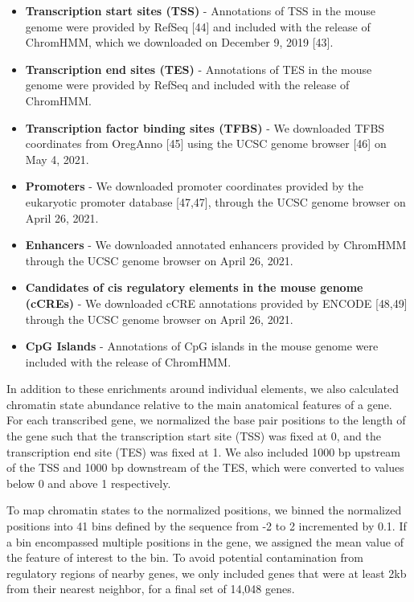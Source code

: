 \documentclass[10pt,letterpaper]{article}
\providecommand{\tightlist}{%
  \setlength{\itemsep}{0pt}\setlength{\parskip}{0pt}}
\begin{document}
\begin{itemize}
\tightlist
\item
  \textbf{Transcription start sites (TSS)} - Annotations of TSS in the
  mouse genome were provided by RefSeq {[}44{]} and included with the
  release of ChromHMM, which we downloaded on December 9, 2019 {[}43{]}.
\item
  \textbf{Transcription end sites (TES)} - Annotations of TES in the
  mouse genome were provided by RefSeq and included with the release of
  ChromHMM.
\item
  \textbf{Transcription factor binding sites (TFBS)} - We downloaded
  TFBS coordinates from OregAnno {[}45{]} using the UCSC genome browser
  {[}46{]} on May 4, 2021.
\item
  \textbf{Promoters} - We downloaded promoter coordinates provided by
  the eukaryotic promoter database {[}47,47{]}, through the UCSC genome
  browser on April 26, 2021.
\item
  \textbf{Enhancers} - We downloaded annotated enhancers provided by
  ChromHMM through the UCSC genome browser on April 26, 2021.
\item
  \textbf{Candidates of cis regulatory elements in the mouse genome
  (cCREs)} - We downloaded cCRE annotations provided by ENCODE
  {[}48,49{]} through the UCSC genome browser on April 26, 2021.
\item
  \textbf{CpG Islands} - Annotations of CpG islands in the mouse genome
  were included with the release of ChromHMM.
\end{itemize}

In addition to these enrichments around individual elements, we also
calculated chromatin state abundance relative to the main anatomical
features of a gene. For each transcribed gene, we normalized the base
pair positions to the length of the gene such that the transcription
start site (TSS) was fixed at 0, and the transcription end site (TES)
was fixed at 1. We also included 1000 bp upstream of the TSS and 1000 bp
downstream of the TES, which were converted to values below 0 and above
1 respectively.

To map chromatin states to the normalized positions, we binned the
normalized positions into 41 bins defined by the sequence from -2 to 2
incremented by 0.1. If a bin encompassed multiple positions in the gene,
we assigned the mean value of the feature of interest to the bin. To
avoid potential contamination from regulatory regions of nearby genes,
we only included genes that were at least 2kb from their nearest
neighbor, for a final set of 14,048 genes.
\end{document}
